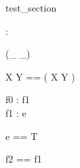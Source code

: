 \begin{zsection}
 \SECTION test\_section
\end{zsection}


\begin{zed}
[ \arithmos ]
\end{zed}


\begin{axdef}
 \nat : \power \arithmos
\end{axdef}




\begin{zed}
 \rightassoc (\_ \rel \_)
\end{zed}

\begin{zed}
X \rel Y == \power ( X \cross Y )
\end{zed}

\begin{axdef}
  f0 : f1\\
  f1 : e
\end{axdef}

\begin{zed}
  e == \nat \rel T\\
  [T]
\end{zed}

\begin{zed}
  f2 == f1
\end{zed}
